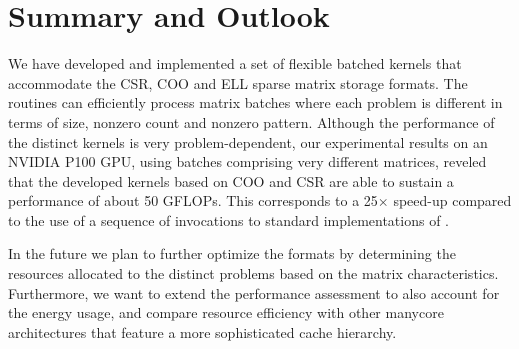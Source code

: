\section{Summary and Outlook}
\label{2017-batched-spmv:sec:s5-conclusion}
We have developed and implemented a set of flexible batched \spmv kernels that accommodate the CSR, 
COO and ELL sparse matrix storage formats. 
The routines can efficiently process matrix
batches where each problem is different in terms of size, nonzero count and nonzero pattern.
Although the performance of the distinct kernels is very problem-dependent, 
our experimental results on an NVIDIA P100 GPU, using batches comprising very different matrices,
reveled that the developed kernels based on COO and CSR are able to sustain a performance of about 50 GFLOPs.
This corresponds to a 25$\times$ speed-up compared to the use of a sequence of invocations to standard implementations
of \spmv.

In the future we plan to further optimize the formats by determining the resources allocated to the distinct problems
based on the matrix characteristics.
Furthermore, we want to extend the performance assessment to also account for the energy usage,
and compare resource efficiency with other manycore architectures that feature a more sophisticated
cache hierarchy.
